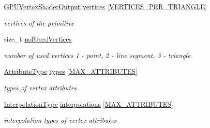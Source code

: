 \begin{DoxyCompactItemize}
\item 
\hyperlink{structGPUVertexShaderOutput}{G\+P\+U\+Vertex\+Shader\+Output} \hyperlink{structGPUPrimitive_a18413cb45917a0f4a519d4807c06a1b6}{vertices} \mbox{[}\hyperlink{fwd_8h_a67df0e09b776eea53360bcc8f4a82ac9}{V\+E\+R\+T\+I\+C\+E\+S\+\_\+\+P\+E\+R\+\_\+\+T\+R\+I\+A\+N\+G\+LE}\mbox{]}\hypertarget{structGPUPrimitive_a18413cb45917a0f4a519d4807c06a1b6}{}\label{structGPUPrimitive_a18413cb45917a0f4a519d4807c06a1b6}

\begin{DoxyCompactList}\small\item\em vertices of the primitive \end{DoxyCompactList}\item 
size\+\_\+t \hyperlink{structGPUPrimitive_aaeea5342673689813c4aff110677d403}{nof\+Used\+Vertices}\hypertarget{structGPUPrimitive_aaeea5342673689813c4aff110677d403}{}\label{structGPUPrimitive_aaeea5342673689813c4aff110677d403}

\begin{DoxyCompactList}\small\item\em number of used vertices 1 -\/ point, 2 -\/ line segment, 3 -\/ triangle \end{DoxyCompactList}\item 
\hyperlink{program_8h_a349a9cde14be8097df865ba0469c0ab2}{Attribute\+Type} \hyperlink{structGPUPrimitive_abf05f0fa2a0b01eddf768d0f8daf0fb9}{types} \mbox{[}\hyperlink{fwd_8h_a4d992a1f9192388588184753115f6c03}{M\+A\+X\+\_\+\+A\+T\+T\+R\+I\+B\+U\+T\+ES}\mbox{]}\hypertarget{structGPUPrimitive_abf05f0fa2a0b01eddf768d0f8daf0fb9}{}\label{structGPUPrimitive_abf05f0fa2a0b01eddf768d0f8daf0fb9}

\begin{DoxyCompactList}\small\item\em types of vertex attributes \end{DoxyCompactList}\item 
\hyperlink{program_8h_a8472f01c511d77bbfb981a46618ea1ea}{Interpolation\+Type} \hyperlink{structGPUPrimitive_a52b0316277ee6ac63d4e898ea3bb1864}{interpolations} \mbox{[}\hyperlink{fwd_8h_a4d992a1f9192388588184753115f6c03}{M\+A\+X\+\_\+\+A\+T\+T\+R\+I\+B\+U\+T\+ES}\mbox{]}\hypertarget{structGPUPrimitive_a52b0316277ee6ac63d4e898ea3bb1864}{}\label{structGPUPrimitive_a52b0316277ee6ac63d4e898ea3bb1864}

\begin{DoxyCompactList}\small\item\em interpolation types of vertex attributes \end{DoxyCompactList}\end{DoxyCompactItemize}


